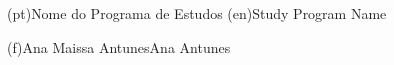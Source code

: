 \ntdegreename*(pt){Nome do Programa de Estudos}
\ntdegreename*(en){Study Program Name}




\ntauthorname(f){Ana Maissa Antunes}{Ana Antunes}

